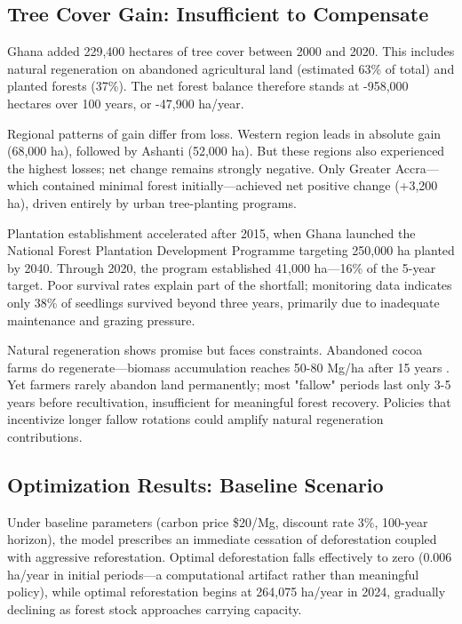 \subsection{Tree Cover Gain: Insufficient to Compensate}

Ghana added 229,400 hectares of tree cover between 2000 and 2020. This includes natural regeneration on abandoned agricultural land (estimated 63\% of total) and planted forests (37\%). The net forest balance therefore stands at -958,000 hectares over 100 years, or -47,900 ha/year.

Regional patterns of gain differ from loss. Western region leads in absolute gain (68,000 ha), followed by Ashanti (52,000 ha). But these regions also experienced the highest losses; net change remains strongly negative. Only Greater Accra—which contained minimal forest initially—achieved net positive change (+3,200 ha), driven entirely by urban tree-planting programs.

Plantation establishment accelerated after 2015, when Ghana launched the National Forest Plantation Development Programme targeting 250,000 ha planted by 2040. Through 2020, the program established 41,000 ha—16\% of the 5-year target. Poor survival rates explain part of the shortfall; monitoring data indicates only 38\% of seedlings survived beyond three years, primarily due to inadequate maintenance and grazing pressure.

Natural regeneration shows promise but faces constraints. Abandoned cocoa farms do regenerate—biomass accumulation reaches 50-80 Mg/ha after 15 years \citep{chazdon2016carbon}. Yet farmers rarely abandon land permanently; most "fallow" periods last only 3-5 years before recultivation, insufficient for meaningful forest recovery. Policies that incentivize longer fallow rotations could amplify natural regeneration contributions.

\subsection{Optimization Results: Baseline Scenario}

Under baseline parameters (carbon price \$20/Mg, discount rate 3\%, 100-year horizon), the model prescribes an immediate cessation of deforestation coupled with aggressive reforestation. Optimal deforestation falls effectively to zero (0.006 ha/year in initial periods—a computational artifact rather than meaningful policy), while optimal reforestation begins at 264,075 ha/year in 2024, gradually declining as forest stock approaches carrying capacity.

